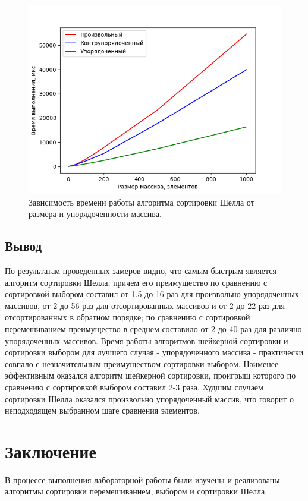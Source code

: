 \documentclass[12pt]{report}
\begin{document}
    \begin{figure}[H]
        \centering
        \includegraphics[width=1\linewidth]{img/shell_graph}
        \caption{Зависимость времени работы алгоритма сортировки Шелла от размера и упорядоченности массива.}
        \label{fig:shell_gr}
    \end{figure}


    \section{Вывод}
    По результатам проведенных замеров видно, что самым быстрым является
    алгоритм сортировки Шелла, причем его преимущество по сравнению с сортировкой выбором составил
    от 1.5 до 16 раз для произвольно упорядоченных массивов, от 2 до 56 раз для отсортированных массивов
    и от 2 до 22 раз для отсортированных в обратном порядке;
    по сравнению с сортировкой перемешиванием преимущество в среднем
    составило от 2 до 40 раз для различно упорядоченных массивов.
    Время работы алгоритмов шейкерной сортировки и сортировки выбором для лучшего случая -
    упорядоченного массива - практически совпало с незначительным преимуществом сортировки выбором.
    Наименее эффективным оказался алгоритм шейкерной сортировки,
    проигрыш которого по сравнению с сортировкой выбором составил 2-3 раза.
    Худшим случаем сортировки Шелла оказался произвольно упорядоченный массив,
    что говорит о неподходящем выбранном шаге сравнения элементов.
    \newpage

    \chapter*{Заключение}
    В процессе выполнения лабораторной работы были изучены и реализованы
    алгоритмы сортировки перемешиванием, выбором и сортировки Шелла.
\end{document}
